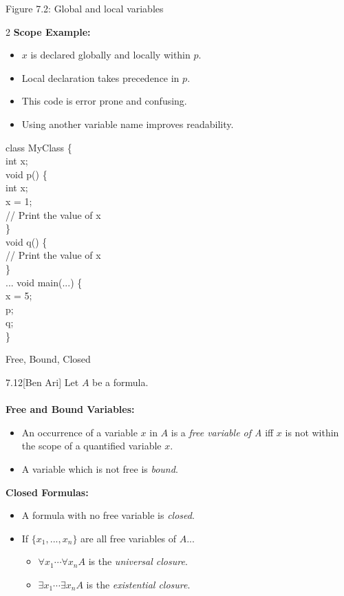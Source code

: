 \documentclass[style=sailor,size=12pt]{powerdot}
\begin{document}
\begin{wideslide}[bm=,toc=]{Figure 7.2: Global and local variables}
\begin{multicols}{2}
\textbf{Scope Example:}
\begin{itemize}
\item $x$ is declared globally and locally within $p$.
\item Local declaration takes precedence in $p$.
\item This code is error prone and confusing.
\item Using another variable name improves readability.
\end{itemize}
\vspace*{-2ex}
\begin{program}
class MyClass \{\\
\>int x;\\
\>void p() \{\\
\>\>int x;\\
\>\>x = 1;\\
\>\>// Print the value of x\\
\>\}\\
\>void q() \{\\
\>\>// Print the value of x\\
\>\}\\
\>... void main(...) \{\\
\>x = 5;\\
\>p;\\
\>q;\\
\}
\end{program}
\end{multicols}
\end{wideslide}

\begin{wideslide}[bm=,toc=]{Free, Bound, Closed}
\begin{defn}{7.12}[Ben Ari] Let $A$ be a formula.\\~\\
\pause
\textbf{Free and Bound Variables:}
\begin{itemize}
\item An occurrence of a variable $x$ in $A$ is a \emph{free variable of A}
iff $x$ is not within the scope of a quantified variable $x$.
\item A variable which is not free is \emph{bound}.
\end{itemize}
\end{defn}
\pause
\textbf{Closed Formulas:}
\begin{itemize}
\item<4-> A formula with no free variable is \emph{closed}.
\item<5-> If $\{x_1,...,x_n\}$ are all free variables of $A$...
  \begin{itemize}
      \item<6->$\forall x_1 \cdots \forall x_n A$ is the \emph{universal closure}.
      \item<7->$\exists x_1 \cdots \exists x_n A$ is the \emph{existential closure}.
  \end{itemize}
\end{itemize}
\vspace*{-2ex}
\end{wideslide}
\end{document}
